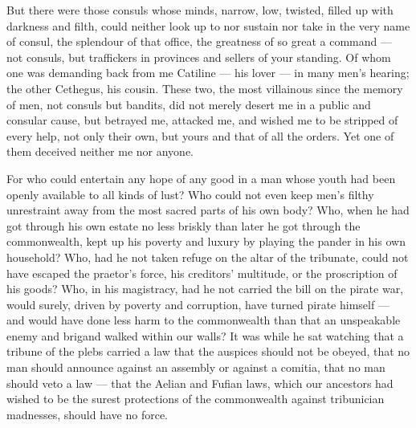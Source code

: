  But there were those consuls whose minds, narrow, low, twisted, filled up with darkness and filth, could neither look up to nor sustain nor take in the very name of consul, the splendour of that office, the greatness of so great a command --- not consuls, but traffickers in provinces and sellers of your standing. Of whom one was demanding back from me Catiline --- his lover --- in many men's hearing; the other Cethegus, his cousin. These two, the most villainous since the memory of men, not consuls but bandits, did not merely desert me in a public and consular cause, but betrayed me, attacked me, and wished me to be stripped of every help, not only their own, but yours and that of all the orders. Yet one of them deceived neither me nor anyone.

 For who could entertain any hope of any good in a man whose youth had been openly available to all kinds of lust? Who could not even keep men's filthy unrestraint away from the most sacred parts of his own body? Who, when he had got through his own estate no less briskly than later he got through the commonwealth, kept up his poverty and luxury by playing the pander in his own household? Who, had he not taken refuge on the altar of the tribunate, could not have escaped the praetor's force, his creditors' multitude, or the proscription of his goods? Who, in his magistracy, had he not carried the bill on the pirate war, would surely, driven by poverty and corruption, have turned pirate himself --- and would have done less harm to the commonwealth than that an unspeakable enemy and brigand walked within our walls? It was while he sat watching that a tribune of the plebs carried a law that the auspices should not be obeyed, that no man should announce against an assembly or against a comitia, that no man should veto a law --- that the Aelian and Fufian laws, which our ancestors had wished to be the surest protections of the commonwealth against tribunician madnesses, should have no force.

